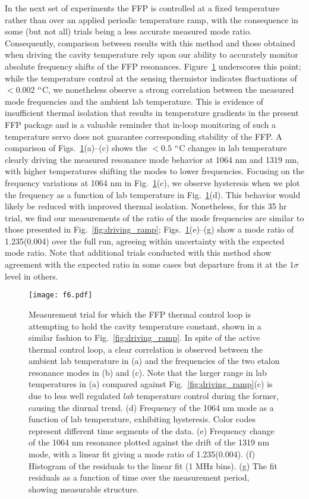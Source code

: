 \documentclass[10pt]{article}
\newcommand{\dC}{$^{\rm o}$C}
\begin{document}
In the next set of experiments the FFP is controlled at a fixed temperature rather than over an applied periodic temperature ramp, with the consequence in some (but not all) trials being a less accurate measured mode ratio. Consequently, comparison between results with this method and those obtained when driving the cavity temperature rely upon our ability to accurately monitor absolute frequency shifts of the FFP resonances. Figure~\ref{fig:natural_ramp} underscores this point; while the temperature control at the sensing thermistor indicates fluctuations of $<$0.002 {\dC}, we nonetheless observe a strong correlation between the measured mode frequencies and the ambient lab temperature.  This is evidence of insufficient thermal isolation that results in temperature gradients in the present FFP package and is a valuable reminder that in-loop monitoring of such a temperature servo does not guarantee corresponding stability of the FFP. A comparison of Figs.~\ref{fig:natural_ramp}(a)--(c) shows the $<0.5$ {\dC} changes in lab temperature clearly driving the measured resonance mode behavior at 1064 nm and 1319 nm, with higher temperatures shifting the modes to lower frequencies. Focusing on the frequency variations at 1064 nm in Fig.~\ref{fig:natural_ramp}(c), we observe hysteresis when we plot the frequency as a function of lab temperature in Fig.~\ref{fig:natural_ramp}(d). This behavior would likely be reduced with improved thermal isolation. Nonetheless, for this 35 hr trial, we find our measurements of the ratio of the mode frequencies are similar to those presented in Fig.~\ref{fig:driving_ramp}; Figs.~\ref{fig:natural_ramp}(e)--(g) show a mode ratio of 1.235(0.004) over the full run, agreeing within uncertainty with the expected mode ratio. Note that additional trials conducted with this method show agreement with the expected ratio in some cases but departure from it at the $1 \sigma$ level in others. 

\begin{figure}
\texttt{[image: f6.pdf]}
\caption{Measurement trial for which the FFP thermal control loop is attempting to hold the cavity temperature constant, shown in a similar fashion to Fig.~\ref{fig:driving_ramp}. In spite of the active thermal control loop, a clear correlation is observed between the ambient lab temperature in (a) and the frequencies of the two etalon resonance modes in (b) and (c). Note that the larger range in lab temperatures in (a) compared against Fig.~\ref{fig:driving_ramp}(c) is due to less well regulated $lab$ temperature control during the former, causing the diurnal trend. (d) Frequency of the 1064 nm mode as a function of lab temperature, exhibiting hysteresis. Color codes represent different time segments of the data. (e) Frequency change of the 1064 nm resonance plotted against the drift of the 1319 nm mode, with a linear fit giving a mode ratio of 1.235(0.004). (f) Histogram of the residuals to the linear fit (1 MHz bins). (g) The fit residuals as a function of time over the measurement period, showing measurable structure.}
\label{fig:natural_ramp}
\end{figure}
\end{document}
